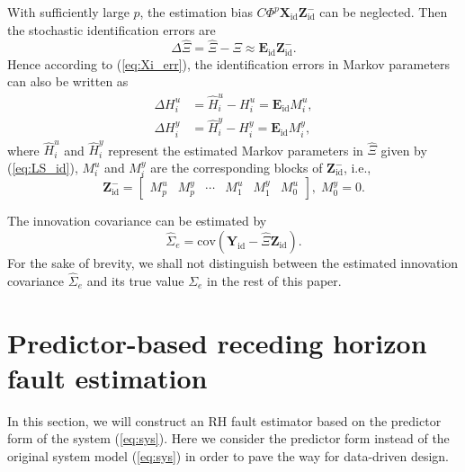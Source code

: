 \documentclass[twocolumn]{autart}
\begin{document}
With sufficiently large $p$, the estimation bias
$C \Phi^p \mathbf{X}_{\mathrm{id}} \mathbf{Z}_{\mathrm{id}}^{-}$ can be neglected. Then the stochastic identification errors are
\begin{equation}\label{eq:Xi_err}
\Delta {\hat \Xi} = \hat \Xi - \Xi \approx \mathbf{E}_{\mathrm{id}} \mathbf{Z}_{\mathrm{id}}^{-}.
\end{equation}
Hence according to (\ref{eq:Xi_err}), the identification errors in Markov parameters can also be written as
\begin{equation}\label{eq:iderr_markov}
\begin{aligned}
\Delta H_i^u &= \hat H_i^u - H_i^u = \mathbf{E}_{\mathrm{id}} {M}_i^u, \\
\Delta H_i^y &= \hat H_i^y - H_i^y = \mathbf{E}_{\mathrm{id}} {M}_i^y,
\end{aligned}
\end{equation}
where $\hat H_i^u$ and $\hat H_i^y$ represent the estimated Markov parameters in $\hat \Xi$ given by (\ref{eq:LS_id}), ${M}_i^u$ and ${M}_i^y$ are the corresponding blocks of $\mathbf{Z}_{\mathrm{id}}^{-}$, i.e.,
\begin{equation}\label{eq:Muy}
\mathbf{Z}_{\mathrm{id}}^{-} =
\left[ \begin{array}{cccccc}
               M_{p}^u & M_{p}^y & \cdots & M_{1}^u & M_{1}^y & M_{0}^u
             \end{array}
 \right],\;
M_{0}^y = 0.
\end{equation}


The innovation covariance can be estimated by \cite{Gust2001, Kata2005}
\begin{equation}\label{eq:hat_Sigma_e}
\hat \Sigma_e = \mathrm{cov}
\left( \mathbf{Y}_{\mathrm{id}} - \hat \Xi \mathbf{Z}_{\mathrm{id}} \right).
\end{equation}
For the sake of brevity, we shall not distinguish between the estimated innovation covariance $\hat \Sigma_e$ and its true value $\Sigma_e$ in the rest of this paper.

\section{Predictor-based receding horizon fault estimation}\label{sect:RHFE_predictor}
In this section, we will construct an RH fault estimator based on the predictor form of the system (\ref{eq:sys}). Here we consider the predictor form instead of the original system model (\ref{eq:sys}) in order to pave the way for data-driven design. 
\end{document}
